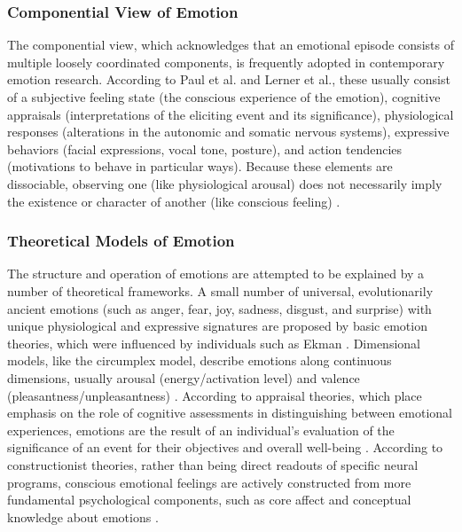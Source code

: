 \documentclass{DESSThesis}
\begin{document}
\subsubsection{Componential View of Emotion}
The componential view, which acknowledges that an emotional episode consists of multiple loosely coordinated components, is frequently adopted in contemporary emotion research. According to Paul et al. and Lerner et al., these usually consist of a subjective feeling state (the conscious experience of the emotion), cognitive appraisals (interpretations of the eliciting event and its significance), physiological responses (alterations in the autonomic and somatic nervous systems), expressive behaviors (facial expressions, vocal tone, posture), and action tendencies (motivations to behave in particular ways). Because these elements are dissociable, observing one (like physiological arousal) does not necessarily imply the existence or character of another (like conscious feeling) \cite{paul_towards_2020}.

\subsubsection{Theoretical Models of Emotion}
The structure and operation of emotions are attempted to be explained by a number of theoretical frameworks. A small number of universal, evolutionarily ancient emotions (such as anger, fear, joy, sadness, disgust, and surprise) with unique physiological and expressive signatures are proposed by basic emotion theories, which were influenced by individuals such as Ekman \cite{paul_towards_2020,mun_science_202}. Dimensional models, like the circumplex model, describe emotions along continuous dimensions, usually arousal (energy/activation level) and valence (pleasantness/unpleasantness) \cite{barsade_ripple_2002}. According to appraisal theories, which place emphasis on the role of cognitive assessments in distinguishing between emotional experiences, emotions are the result of an individual's evaluation of the significance of an event for their objectives and overall well-being \cite{lerner_emotion_2015,parkinson_current_2015}. According to constructionist theories, rather than being direct readouts of specific neural programs, conscious emotional feelings are actively constructed from more fundamental psychological components, such as core affect and conceptual knowledge about emotions \cite{paul_towards_2020,mun_science_2022}.
\end{document}
